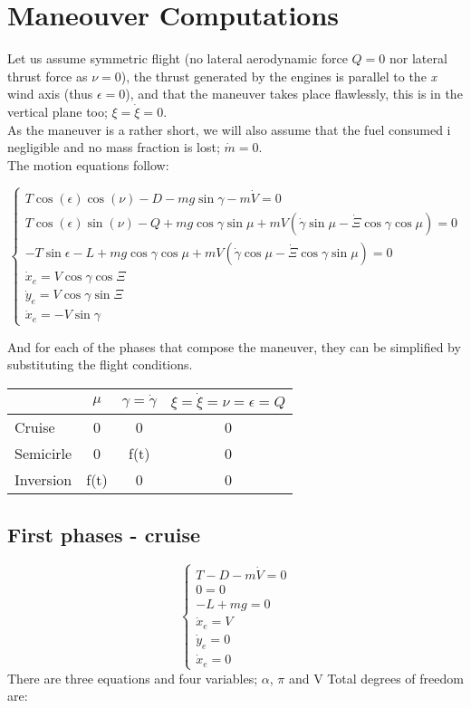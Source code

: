 \section*{Maneouver Computations}
Let us assume symmetric flight (no lateral aerodynamic force $Q=0$ nor lateral thrust force as $\nu=0$), the thrust generated by the engines is parallel to the \textit{x} wind axis (thus $\epsilon=0$),  and that the maneuver takes place flawlessly, this is in the vertical plane too; $\xi=\dot{\xi}=0$.\\
As the maneuver is a rather short, we will also assume that the fuel consumed i negligible and no mass fraction is lost; $\dot{m}=0$.\\
The motion equations follow:

\begin{equation*}
	\begin{cases}
	T\cos(\epsilon)\cos(\nu) - D -mg\sin\gamma-m\dot{V}=0\\
	T\cos(\epsilon)\sin(\nu) - Q+mg\cos\gamma\sin\mu+mV(\dot{\gamma}\sin\mu-\dot{\Xi}\cos\gamma\cos\mu)=0\\
	-T\sin\epsilon-L+mg\cos\gamma\cos\mu+mV(\dot{\gamma}\cos\mu-\dot{\Xi}\cos\gamma\sin\mu)=0\\
	\dot{x}_e=V\cos\gamma\cos\Xi\\
	\dot{y}_e=V\cos\gamma\sin\Xi\\
	\dot{x}_e=-V\sin\gamma
	\end{cases}
\end{equation*}

And for each of the phases that compose the maneuver, they can be simplified by substituting the flight conditions.

\begin{center}
\begin{tabular}{|l|c|c|c|}\hline
	& $\mu$ & $\gamma=\dot{\gamma}$ & $\xi=\dot{\xi}=\nu=\epsilon=Q$\\ \hline  \hline
	Cruise & 0 & 0 & 0 \\ \hline
	Semicirle & 0 & f(t) & 0 \\ \hline
	Inversion& f(t) & 0 & 0 \\ \hline
\end{tabular}
\end{center}

\subsection*{First phases - cruise}
\begin{equation}
	\begin{cases}
		T - D -m\dot{V}=0\\
		0=0\\
		-L+mg=0\\
		\dot{x}_e=V\\
		\dot{y}_e=0\\
		\dot{x}_e=0
	\end{cases}
\end{equation}
There are three equations and four variables; $\alpha$, $\pi$ and V
Total degrees of freedom are:

